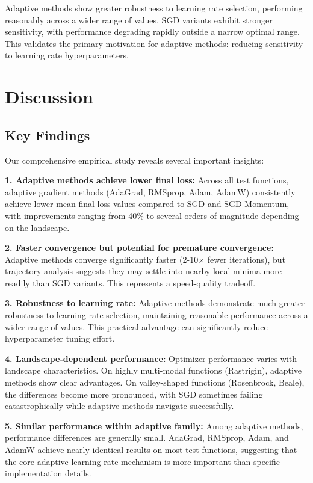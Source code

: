 \documentclass[12pt,a4paper]{article}
\begin{document}
Adaptive methods show greater robustness to learning rate selection, performing reasonably across a wider range of values. SGD variants exhibit stronger sensitivity, with performance degrading rapidly outside a narrow optimal range. This validates the primary motivation for adaptive methods: reducing sensitivity to learning rate hyperparameters.

\section{Discussion}
\label{sec:discussion}

\subsection{Key Findings}

Our comprehensive empirical study reveals several important insights:

\textbf{1. Adaptive methods achieve lower final loss:} Across all test functions, adaptive gradient methods (AdaGrad, RMSprop, Adam, AdamW) consistently achieve lower mean final loss values compared to SGD and SGD-Momentum, with improvements ranging from 40\% to several orders of magnitude depending on the landscape.

\textbf{2. Faster convergence but potential for premature convergence:} Adaptive methods converge significantly faster (2-10× fewer iterations), but trajectory analysis suggests they may settle into nearby local minima more readily than SGD variants. This represents a speed-quality tradeoff.

\textbf{3. Robustness to learning rate:} Adaptive methods demonstrate much greater robustness to learning rate selection, maintaining reasonable performance across a wider range of values. This practical advantage can significantly reduce hyperparameter tuning effort.

\textbf{4. Landscape-dependent performance:} Optimizer performance varies with landscape characteristics. On highly multi-modal functions (Rastrigin), adaptive methods show clear advantages. On valley-shaped functions (Rosenbrock, Beale), the differences become more pronounced, with SGD sometimes failing catastrophically while adaptive methods navigate successfully.

\textbf{5. Similar performance within adaptive family:} Among adaptive methods, performance differences are generally small. AdaGrad, RMSprop, Adam, and AdamW achieve nearly identical results on most test functions, suggesting that the core adaptive learning rate mechanism is more important than specific implementation details.
\end{document}
